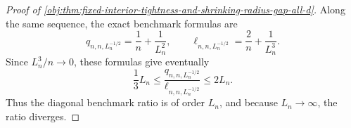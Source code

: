 \begin{proof}[Proof of \cref{obj:thm:fixed-interior-tightness-and-shrinking-radius-gap-all-d}]
Along the same sequence, the exact benchmark formulas are
\[
q_{n,n,L_n^{-1/2}}=\frac1n+\frac1{L_n^2},\qquad
\ell_{n,n,L_n^{-1/2}}=\frac2n+\frac1{L_n^3}.
\]
Since \(L_n^3/n\to0\), these formulas give eventually
\[
\frac13 L_n
\le
\frac{q_{n,n,L_n^{-1/2}}}{\ell_{n,n,L_n^{-1/2}}}
\le
2L_n.
\]
Thus the diagonal benchmark ratio is of order \(L_n\), and because \(L_n\to\infty\), the ratio diverges.
\end{proof}
